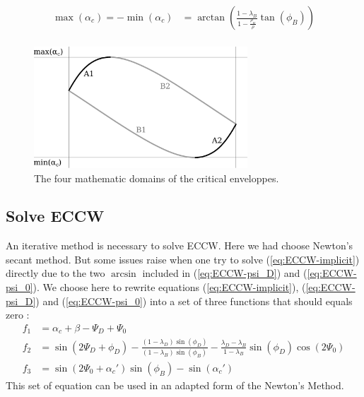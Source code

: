 \documentclass[a4paper]{scrartcl}
\begin{document}
\begin{align}
	\max(\alpha_c) = - \min(\alpha_c) &= \arctan \left( \frac{1 - \lambda_B}{1 - \frac{\rho_w}{\rho}} \tan(\phi_B) \right)
	\label{eq:alphaminmax}\\
\end{align}


\begin{figure}[h]
	\centering
	\includegraphics[width=8cm]{ECCW_maths_domains.pdf} 
	\caption{The four mathematic domains of the critical enveloppes.}
	\label{fig:maths-domains}
\end{figure}

\subsection{Solve ECCW}

An iterative method is necessary to solve ECCW. 
Here we had choose Newton's secant method.
But some issues raise when one try to solve (\ref{eq:ECCW-implicit}) directly due to the two $\arcsin$ included in (\ref{eq:ECCW-psi_D}) and (\ref{eq:ECCW-psi_0}).
We choose here to rewrite equations (\ref{eq:ECCW-implicit}), (\ref{eq:ECCW-psi_D}) and (\ref{eq:ECCW-psi_0}) into a set of three functions that should equals zero :
\begin{align}
	f_1 &= \alpha_c + \beta - \Psi_D + \Psi_0
	\label{eq:f1} \\
	f_2 &= \sin(2 \Psi_D + \phi_D) - \frac{(1 - \lambda_D) \sin(\phi_D)}{(1 - \lambda_B) \sin(\phi_B)} - \frac{\lambda_D - \lambda_B}{1 - \lambda_B} \sin(\phi_D) \cos(2 \Psi_0)  
	\label{eq:f2} \\
	f_3 &= \sin(2 \Psi_0 + \alpha_c') \sin(\phi_B) - \sin(\alpha_c')
	\label{eq:f3} 
\end{align}
This set of equation can be used in an adapted form of the Newton's Method.

\end{document}
